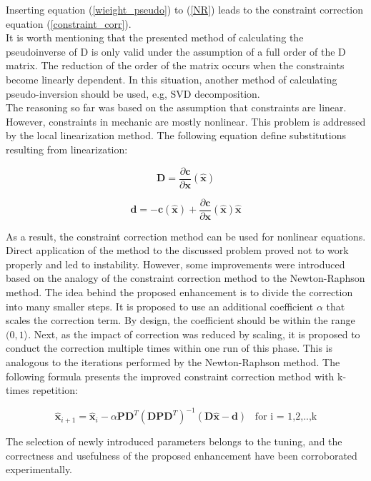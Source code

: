 Inserting equation (\ref{wieight_pseudo}) to (\ref{NR}) leads to the constraint correction equation (\ref{constraint_corr}).\\

It is worth mentioning that the presented method of calculating the pseudoinverse of D is only valid under the assumption of a full order of the D matrix. The reduction of the order of the matrix occurs when the constraints become linearly dependent. In this situation, another method of calculating pseudo-inversion should be used, e.g, SVD decomposition. \cite{golub2013matrix}\\

The reasoning so far was based on the assumption that constraints are linear. 
However, constraints in mechanic are mostly nonlinear. This problem is addressed by the local linearization method. The following equation define substitutions resulting from linearization:

\begin{equation}
	\bm{D} = \frac{\partial \bm{c}}{\partial \bm{x}}(\bm{\hat{x}})
	\label{linearization1}
\end{equation}

\begin{equation}
	\bm{d} =  - \bm{c} (\bm{\hat{x}}) +  \frac{\partial \bm{c}}{\partial \bm{x}}(\bm{\hat{x}}) \bm{\hat{x}}
	\label{linearization2}
\end{equation}

As a result, the constraint correction method can be used for nonlinear equations.\\ 

Direct application of the method to the discussed problem proved not to work properly and led to instability. However, some improvements were introduced based on the analogy of the constraint correction method to the Newton-Raphson method. The idea behind the proposed enhancement is to divide the correction into many smaller steps. It is proposed to use an additional coefficient $\alpha$ that scales the correction term. By design, the coefficient should be within the range $(0, 1 \rangle $. Next, as the impact of correction was reduced by scaling, it is proposed to conduct the correction multiple times within one run of this phase. This is analogous to the iterations performed by the Newton-Raphson method. The following formula presents the improved constraint correction method with k-times repetition:

\begin{equation}
	\bm{\hat{x}}_{i+1} = \bm{\hat{x}}_{i} - \alpha \bm{P} \bm{D}^T \left( \bm{D} \bm{P} \bm{D}^T \right)^{-1} \left( \bm{D} \bm{\hat{x}} - \bm{d}  \right) \hspace{10pt} \text{for i = 1,2,..,k}
	\label{constraint_final}
\end{equation}

The selection of newly introduced parameters belongs to the tuning, and the correctness and usefulness of the proposed enhancement have been corroborated experimentally.